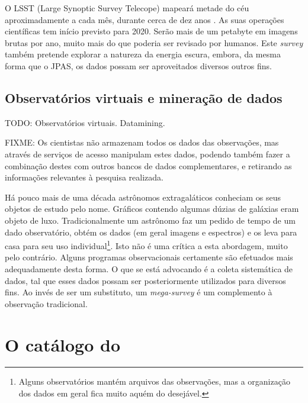 O LSST (Large Synoptic Survey Telecope) mapeará metade do céu aproximadamente a
cada mês, durante cerca de dez anos \citep{Ivezic2008}. As suas operações
científicas tem início previsto para 2020. Serão mais de um petabyte em imagens
brutas por ano, muito mais do que poderia ser revisado por humanos. Este {\em
survey} também pretende explorar a natureza da energia escura, embora, da mesma
forma que o JPAS, os dados possam ser aproveitados diversos outros fins.

\subsection{Observatórios virtuais e mineração de dados}

TODO: Observatórios virtuais. Datamining.

FIXME: Os cientistas não armazenam todos os dados das observações, mas através
de serviços de acesso manipulam estes dados, podendo também fazer a combinação
destes com outros bancos de dados complementares, e retirando as informações
relevantes à pesquisa realizada.

Há pouco mais de uma década astrônomos extragaláticos conheciam os seus objetos
de estudo pelo nome. Gráficos contendo algumas dúzias de galáxias eram objeto de
luxo. Tradicionalmente um astrônomo faz um pedido de tempo de um dado
observatório, obtém os dados (em geral imagens e espectros) e os leva para casa
para seu uso individual\footnote{Alguns observatórios mantém arquivos das
observações\citneed, mas a organização dos dados em geral fica muito aquém do
desejável.}. Isto não é uma crítica a esta abordagem, muito pelo contrário.
Alguns programas observacionais certamente são efetuados mais adequadamente
desta forma. O que se está advocando é a coleta sistemática de dados, tal que
esses dados possam ser posteriormente utilizados para diversos fins. Ao invés de
ser um substituto, um {\em mega-survey} é um complemento à observação
tradicional.



\section{O catálogo do \starlight}
\label{sec:Intro:Starlight}

